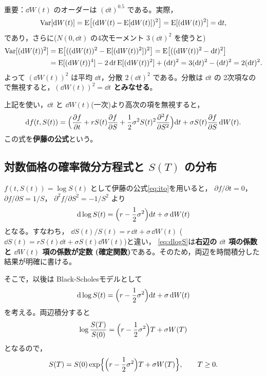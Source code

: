 \begin{keypoint}[$(\dd W(t))^2 = \dd t$：このページが肝心!]
重要：$\dd W(t)$ のオーダーは $(\dd t)^{0.5}$ である。実際，
\[
\mathrm{Var}[\mathrm{d} W(t)] = \mathrm{E}\bigl[(\mathrm{d} W(t) - \mathrm{E}[\mathrm{d} W(t)])^2\bigr]
= \mathrm{E}[(\mathrm{d} W(t))^2] = \mathrm{d} t,
\]
であり，さらに($N(0,\dd t)$ の4次モーメント $3(\dd t)^2$ を使うと)
\begin{align*}
\mathrm{Var}[(\mathrm{d} W(t))^2]
&= \mathrm{E}\bigl[((\mathrm{d} W(t))^2 - \mathrm{E}[(\mathrm{d} W(t))^2])^2\bigr]
= \mathrm{E}\bigl[((\mathrm{d} W(t))^2 - \mathrm{d} t)^2\bigr]\\
&= \mathrm{E}[(\mathrm{d} W(t))^4] - 2\,\mathrm{d} t\,\mathrm{E}[(\mathrm{d} W(t))^2] + (\mathrm{d} t)^2
= 3(\mathrm{d} t)^2 - (\mathrm{d} t)^2 = 2(\mathrm{d} t)^2.
\end{align*}
よって $(\dd W(t))^2$ は平均 $\dd t$，分散 $2(\dd t)^2$ である。分散は $\dd t$ の
2次項なので無視すると，\textbf{$(\dd W(t))^2 = \dd t$ とみなせる}。
\end{keypoint}

上記を使い，$\dd t$ と $\dd W(t)$(一次)より高次の項を無視すると，
\begin{equation}
\mathrm{d} f(t,S(t))
= \Bigl(\frac{\partial f}{\partial t} + rS(t)\frac{\partial f}{\partial S}
+ \frac{1}{2}\sigma^2S(t)^2\frac{\partial^2 f}{\partial S^2}\Bigr)\mathrm{d} t
+ \sigma S(t)\frac{\partial f}{\partial S}\,\mathrm{d} W(t).
\label{eq:ito}
\end{equation}
この式を\textbf{伊藤の公式}という。

\subsection{対数価格の確率微分方程式と $S(T)$ の分布}

$f(t,S(t)) = \log S(t)$ として伊藤の公式\eqref{eq:ito}を用いると，
$\partial f/\partial t = 0$， $\partial f/\partial S = 1/S$，
$\partial^2 f/\partial S^2 = -1/S^2$ より
\begin{equation}
\mathrm{d}\log S(t)
= \Bigl(r - \frac{1}{2}\sigma^2\Bigr)\mathrm{d} t + \sigma\,\mathrm{d} W(t)
\label{eq:dlogS}
\end{equation}
となる。すなわち，
$\dd S(t)/S(t) = r\,\dd t + \sigma\,\dd W(t)$
($\dd S(t) = rS(t)\dd t + \sigma S(t)\dd W(t)$)と違い，
\eqref{eq:dlogS}は\textbf{右辺の $\dd t$ 項の係数と $\dd W(t)$ 項の係数が定数
(確定関数)}である。そのため，両辺を時間積分した結果が明確に書ける。

そこで，以後は Black-Scholesモデルとして
\begin{equation}
\mathrm{d}\log S(t) = \Bigl(r - \frac{1}{2}\sigma^2\Bigr)\mathrm{d} t + \sigma\,\mathrm{d} W(t)
\end{equation}
を考える。両辺積分すると
\[
\log\frac{S(T)}{S(0)} = \Bigl(r - \frac{1}{2}\sigma^2\Bigr)T + \sigma W(T)
\]
となるので，
\begin{equation}
S(T) = S(0)\exp\Bigl\{\Bigl(r - \frac{1}{2}\sigma^2\Bigr)T + \sigma W(T)\Bigr\},
\qquad T \geq 0.
\label{eq:ST}
\end{equation}

